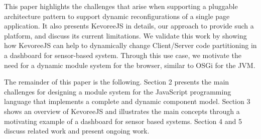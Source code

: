 This paper highlights the challenges that arise when supporting a pluggable architecture pattern to support dynamic reconfigurations of a single page application. It also presents KevoreeJS in details, our approach to provide such a platform, and discuss its current limitations. We validate this work by showing how KevoreeJS can help to dynamically change Client/Server code partitioning in a dashboard for sensor-based system. Through this use case, we motivate the need for a dynamic module system for the browser, similar to OSGi for the JVM.  

The remainder of this paper is the following. Section 2 presents the main challenges for designing a module system for the JavaScript programming language that implements a complete and dynamic component model. Section 3 shows an overview of KevoreeJS and illustrates the main concepts through a motivating example of a dashboard for sensor based systems. Section 4 and 5 discuss related work and present ongoing work. 